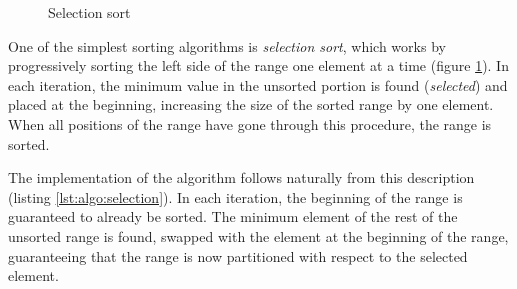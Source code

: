 \begin{figure}[p]
    \centering
    
    \vspace{2\baselineskip}
    
    \caption{Selection sort}
    \label{fig:algo:selection}
\end{figure}

One of the simplest sorting algorithms is \textit{selection sort}, which works
by progressively sorting the left side of the range one element at a time
(figure \ref{fig:algo:selection}).  In each iteration, the minimum value in the
unsorted portion is found (\emph{selected}) and placed at the beginning,
increasing the size of the sorted range by one element.  When all positions of
the range have gone through this procedure, the range is sorted.

The implementation of the algorithm follows naturally from this description
(listing \ref{lst:algo:selection}).  In each iteration, the beginning of the
range is guaranteed to already be sorted.  The minimum element of the rest of
the unsorted range is found, swapped with the element at the beginning of the
range, guaranteeing that the range is now partitioned with respect to the
selected element.
